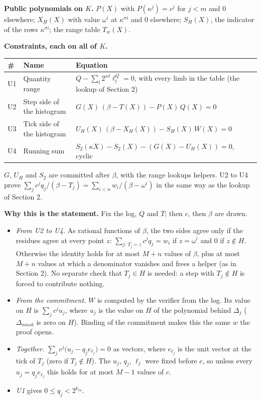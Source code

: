 \textbf{Public polynomials on \(K\).} \(P(X)\) with \(P(\kappa^j) = c^j\) for \(j < m\) and 0 elsewhere; \(X_H(X)\) with value \(\omega^i\) at \(\kappa^{\sigma i}\) and 0 elsewhere; \(S_H(X)\), the indicator of the rows \(\kappa^{\sigma i}\); the range table \(T_w(X)\).

\textbf{Constraints, each on all of \(K\).}

\begin{longtable}[]{@{}lll@{}}
\toprule\noalign{}
\# & Name & Equation \\
\midrule\noalign{}
\endhead
\bottomrule\noalign{}
\endlastfoot
U1 & Quantity range & \(Q - \sum_l 2^{wl} \ell^Q_l = 0\), with every limb in the table (the lookup of Section 2) \\
U2 & Step side of the histogram & \(G(X)\,(\beta - T(X)) - P(X)\,Q(X) = 0\) \\
U3 & Tick side of the histogram & \(U_H(X)\,(\beta - X_H(X)) - S_H(X)\,W(X) = 0\) \\
U4 & Running sum & \(S_2(\kappa X) - S_2(X) - (G(X) - U_H(X)) = 0\), cyclic \\
\end{longtable}

\(G\), \(U_H\) and \(S_2\) are committed after \(\beta\), with the range lookup\textquotesingle s helpers. U2 to U4 prove \(\sum_j c^j q_j/(\beta - T_j) = \sum_{i<n} w_i/(\beta - \omega^i)\) in the same way as the lookup of Section 2.

\textbf{Why this is the statement.} Fix the log, \(Q\) and \(T\); then \(c\), then \(\beta\) are drawn.

\begin{itemize}
\item
  \emph{From U2 to U4.} As rational functions of \(\beta\), the two sides agree only if the residues agree at every point \(z\): \(\sum_{j:\,T_j = z} c^j q_j = w_i\) if \(z = \omega^i\) and \(0\) if \(z \notin H\). Otherwise the identity holds for at most \(M + n\) values of \(\beta\), plus at most \(M + n\) values at which a denominator vanishes and frees a helper (as in Section 2). No separate check that \(T_j \in H\) is needed: a step with \(T_j \notin H\) is forced to contribute nothing.
\item
  \emph{From the commitment.} \(W\) is computed by the verifier from the log. Its value on \(H\) is \(\sum_j c^j u_j\), where \(u_j\) is the value on \(H\) of the polynomial behind \(\Delta_j\) (\(\Delta_{mask}\) is zero on \(H\)). Binding of the commitment makes this the same \(w\) the proof opens.
\item
  \emph{Together.} \(\sum_j c^j \big(u_j - q_j e_{\ell_j}\big) = 0\) as vectors, where \(e_{\ell_j}\) is the unit vector at the tick of \(T_j\) (zero if \(T_j \notin H\)). The \(u_j\), \(q_j\), \(\ell_j\) were fixed before \(c\), so unless every \(u_j = q_j e_{\ell_j}\) this holds for at most \(M - 1\) values of \(c\).
\item
  \emph{U1} gives \(0 \le q_j < 2^{k_{in}}\).
\end{itemize}

